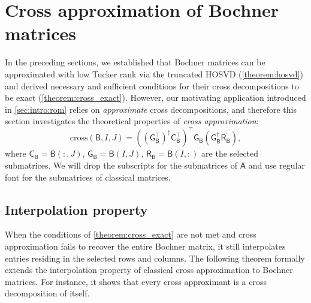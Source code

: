 \documentclass[onefignum,onetabnum]{siamart250211}
\renewenvironment{equation*}{\[}{\]\ignorespacesafterend}
\newcommand{\Batrix}[1]{\bm{\Matrix{#1}}}
\newcommand{\Matrix}[1]{\mathsf{#1}}
\newcommand{\trans}{\intercal}
\newcommand{\pinv}{\dagger}
\newcommand{\Index}[1]{{#1}}
\newcommand{\cross}[3][]{\mathrm{cross}#1(#2, #3 #1)}
\begin{document}
\section{Cross approximation of Bochner matrices}
\label{sec:cross}
In the preceding sections, we established that Bochner matrices can be approximated with low Tucker rank via the truncated HOSVD (\cref{theorem:hosvd}) and derived necessary and sufficient conditions for their cross decompositions to be exact (\cref{theorem:cross_exact}).
However, our motivating application introduced in \cref{sec:intro:rom} relies on \emph{approximate} cross decompositions, and therefore this section investigates the theoretical properties of \emph{cross approximation}:
\begin{equation*}
    \cross{\Batrix{B}}{\Index{I}, \Index{J}} = ((\Batrix{G}_{\Batrix{B}}^\trans)^\pinv \Batrix{C}_{\Batrix{B}}^\trans)^\trans \Batrix{G}_{\Batrix{B}} (\Batrix{G}_{\Batrix{B}}^\pinv \Batrix{R}_{\Batrix{B}}),
\end{equation*}
where $\Batrix{C}_{\Batrix{B}} = \Batrix{B}(:, \Index{J})$, $\Batrix{G}_{\Batrix{B}} = \Batrix{B}(\Index{I}, \Index{J})$, $\Batrix{R}_{\Batrix{B}} = \Batrix{B}(\Index{I}, :)$ are the selected submatrices.
We will drop the subscripts for the submatrices of $\Batrix{A}$ and use regular font for the submatrices of classical matrices.

\subsection{Interpolation property}
When the conditions of \cref{theorem:cross_exact} are not met and cross approximation fails to recover the entire Bochner matrix, it still interpolates entries residing in the selected rows and columns.
The following theorem formally extends the interpolation property of classical cross approximation to Bochner matrices.
For instance, it shows that every cross approximant is a cross decomposition of itself.
\end{document}
